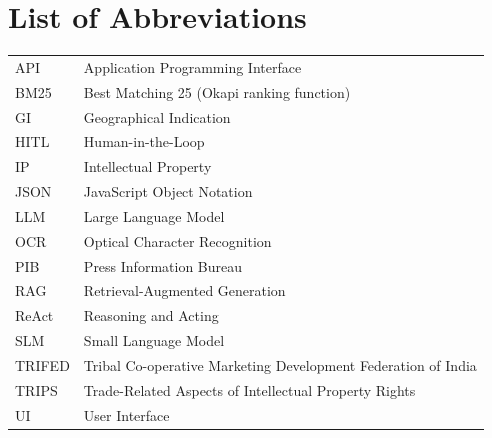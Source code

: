 \documentclass[12pt,a4paper,oneside]{report}
\begin{document}
\chapter*{List of Abbreviations}
\thispagestyle{frontmatter}
\begin{tabular}{@{}p{2.8cm}l@{}}
API & Application Programming Interface \\
BM25 & Best Matching 25 (Okapi ranking function) \\
GI & Geographical Indication \\
HITL & Human-in-the-Loop \\
IP & Intellectual Property \\
JSON & JavaScript Object Notation \\
LLM & Large Language Model \\
OCR & Optical Character Recognition \\
PIB & Press Information Bureau \\
RAG & Retrieval-Augmented Generation \\
ReAct & Reasoning and Acting \\
SLM & Small Language Model \\
TRIFED & Tribal Co-operative Marketing Development Federation of India \\
TRIPS & Trade-Related Aspects of Intellectual Property Rights \\
UI & User Interface \\
\end{tabular}

\clearpage
\ClearShipoutPictureBG
\pagestyle{mainbody}














\appendix

\end{document}
